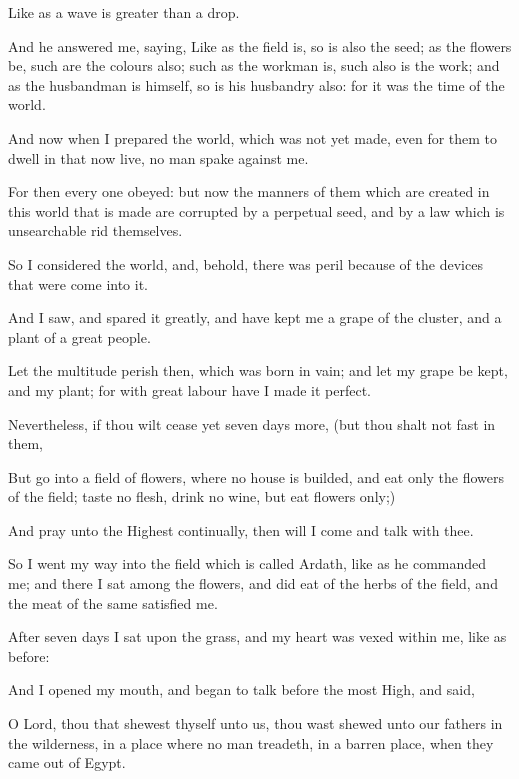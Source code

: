 {\par }{\PP {}Like as a wave is greater than a drop.
\par }{\PP {}And he answered me, saying, Like as the field is, so is also the seed; as the flowers be, such are the colours also; such as the workman is, such also is the work; and as the husbandman is himself, so is his husbandry also: for it was the time of the world.
\par }{\PP {}And now when I prepared the world, which was not yet made, even for them to dwell in that now live, no man spake against me.
\par }{\PP {}For then every one obeyed: but now the manners of them which are created in this world that is made are corrupted by a perpetual seed, and by a law which is unsearchable rid themselves.
\par }{\PP {}So I considered the world, and, behold, there was peril because of the devices that were come into it.
\par }{\PP {}And I saw, and spared it greatly, and have kept me a grape of the cluster, and a plant of a great people.
\par }{\PP {}Let the multitude perish then, which was born in vain; and let my grape be kept, and my plant; for with great labour have I made it perfect.
\par }{\PP {}Nevertheless, if thou wilt cease yet seven days more, (but thou shalt not fast in them,
\par }{\PP {}But go into a field of flowers, where no house is builded, and eat only the flowers of the field; taste no flesh, drink no wine, but eat flowers only;)
\par }{\PP {}And pray unto the Highest continually, then will I come and talk with thee.
\par }{\PP {}So I went my way into the field which is called Ardath, like as he commanded me; and there I sat among the flowers, and did eat of the herbs of the field, and the meat of the same satisfied me.
\par }{\PP {}After seven days I sat upon the grass, and my heart was vexed within me, like as before:
\par }{\PP {}And I opened my mouth, and began to talk before the most High, and said,
\par }{\PP {}O Lord, thou that shewest thyself unto us, thou wast shewed unto our fathers in the wilderness, in a place where no man treadeth, in a barren place, when they came out of Egypt.
}
